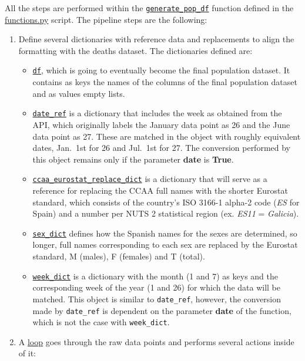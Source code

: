 \documentclass[
  a4paper]{article}
\begin{document}
All the steps are performed within the
\href{https://github.com/dreth/tfm_uc3m/blob/report_ref/api/functions.py\#L190}{\texttt{generate\_pop\_df}}
function defined in the
\href{https://github.com/dreth/tfm_uc3m/blob/main/api/functions.py}{functions.py}
script. The pipeline steps are the following:

\begin{enumerate}
\def\labelenumi{\arabic{enumi}.}
\item
  Define several dictionaries with reference data and replacements to
  align the formatting with the deaths dataset. The dictionaries defined
  are:

  \begin{itemize}
  \item
    \href{https://github.com/dreth/tfm_uc3m/blob/report_ref/api/functions.py\#L197-L203}{\texttt{df}},
    which is going to eventually become the final population dataset. It
    contains as keys the names of the columns of the final population
    dataset and as values empty lists.
  \item
    \href{https://github.com/dreth/tfm_uc3m/blob/report_ref/api/functions.py\#L206-L209}{\texttt{date\_ref}}
    is a dictionary that includes the week as obtained from the API,
    which originally labels the January data point as 26 and the June
    data point as 27. These are matched in the object with roughly
    equivalent dates, Jan.~1st for 26 and Jul.~1st for 27. The
    conversion performed by this object remains only if the parameter
    \textbf{date} is \textbf{True}.
  \item
    \href{https://github.com/dreth/tfm_uc3m/blob/report_ref/api/functions.py\#L212-L232}{\texttt{ccaa\_eurostat\_replace\_dict}}
    is a dictionary that will serve as a reference for replacing the
    CCAA full names with the shorter Eurostat standard, which consists
    of the country's ISO 3166-1 alpha-2 code (\emph{ES} for Spain) and a
    number per NUTS 2 statistical region (ex. \emph{ES11} =
    \emph{Galicia}).
  \item
    \href{https://github.com/dreth/tfm_uc3m/blob/report_ref/api/functions.py\#L235-L239}{\texttt{sex\_dict}}
    defines how the Spanish names for the sexes are determined, so
    longer, full names corresponding to each sex are replaced by the
    Eurostat standard, M (males), F (females) and T (total).
  \item
    \href{https://github.com/dreth/tfm_uc3m/blob/report_ref/api/functions.py\#L242-L245}{\texttt{week\_dict}}
    is a dictionary with the month (1 and 7) as keys and the
    corresponding week of the year (1 and 26) for which the data will be
    matched. This object is similar to \texttt{date\_ref}, however, the
    conversion made by \texttt{date\_ref} is dependent on the parameter
    \textbf{date} of the function, which is not the case with
    \texttt{week\_dict}.
  \end{itemize}
\item
  A
  \href{https://github.com/dreth/tfm_uc3m/blob/report_ref/api/functions.py\#L247-L279}{loop}
  goes through the raw data points and performs several actions inside
  of it:


\end{enumerate}
\end{document}
